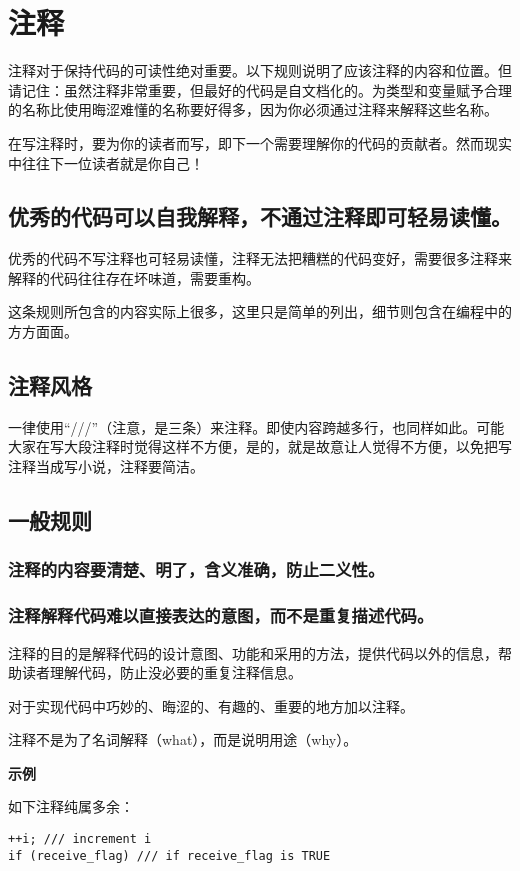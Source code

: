 \chapter{注释}
注释对于保持代码的可读性绝对重要。以下规则说明了应该注释的内容和位置。但请记住：虽然注释非常重要，但最好的代码是自文档化的。为类型和变量赋予合理的名称比使用晦涩难懂的名称要好得多，因为你必须通过注释来解释这些名称。

在写注释时，要为你的读者而写，即下一个需要理解你的代码的贡献者。然而现实中往往下一位读者就是你自己！


\section{优秀的代码可以自我解释，不通过注释即可轻易读懂。}
优秀的代码不写注释也可轻易读懂，注释无法把糟糕的代码变好，需要很多注释来解释的代码往往存在坏味道，需要重构。

这条规则所包含的内容实际上很多，这里只是简单的列出，细节则包含在编程中的方方面面。

\section{注释风格}
一律使用“///”（注意，是三条）来注释。即使内容跨越多行，也同样如此。可能大家在写大段注释时觉得这样不方便，是的，就是故意让人觉得不方便，以免把写注释当成写小说，注释要简洁。


\section{一般规则}

\subsection{注释的内容要清楚、明了，含义准确，防止二义性。}

\subsection{注释解释代码难以直接表达的意图，而不是重复描述代码。}
注释的目的是解释代码的设计意图、功能和采用的方法，提供代码以外的信息，帮助读者理解代码，防止没必要的重复注释信息。

对于实现代码中巧妙的、晦涩的、有趣的、重要的地方加以注释。

注释不是为了名词解释（what），而是说明用途（why）。

\textbf{示例}

如下注释纯属多余：
\begin{verbatim}
++i; /// increment i
if (receive_flag) /// if receive_flag is TRUE
\end{verbatim}

